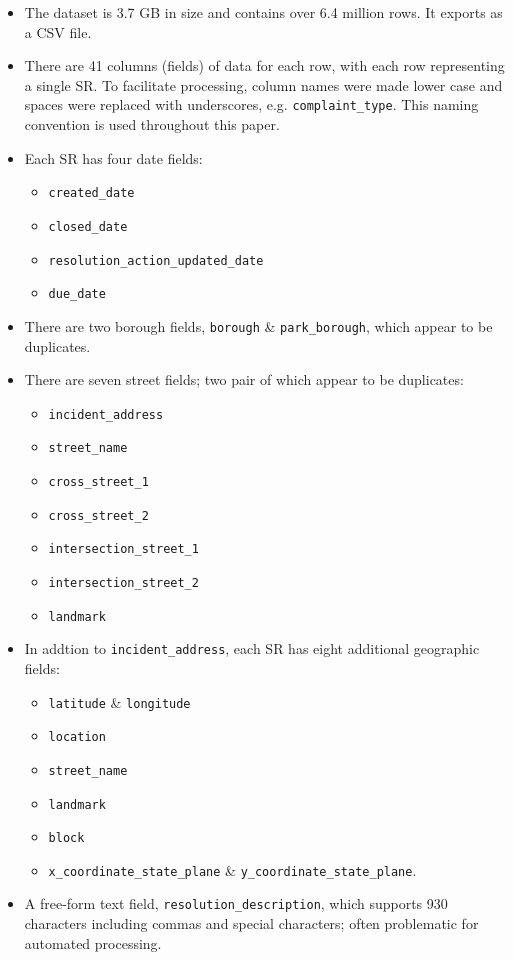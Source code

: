 \documentclass[linenumber]{jdsart}
\begin{document}
\begin{itemize}[left=1.5em]
\item The dataset is 3.7 GB in size and contains 
  over 6.4 million rows. It exports as a CSV file.

\item There are 41 columns (fields) of data for each row, with each
  row representing a single SR. To facilitate 
  processing, column names were made lower case and 
  spaces were replaced with underscores, e.g. \texttt{complaint\_type}. 
  This naming convention is used throughout this paper. 
	
\item Each SR has four date fields: 
	\begin{itemize}	
		\item{\texttt{created\_date}}
		\item{\texttt{closed\_date}}
		\item{\texttt{resolution\_action\_updated\_date}}
		\item{\texttt{due\_date}}
	\end{itemize}

\item There are two borough fields, \texttt{borough} \& \texttt{park\_borough}, 
		which appear to be duplicates.
  
\item There are seven street fields; two pair of which appear to be duplicates:
	\begin{itemize}
		\item{\texttt{incident\_address}}
		\item{\texttt{street\_name}}
		\item{\texttt{cross\_street\_1}}
		\item{\texttt{cross\_street\_2}}
		\item{\texttt{intersection\_street\_1}}
		\item{\texttt{intersection\_street\_2}}
		\item{\texttt{landmark}}
	\end{itemize}
          
\item In addtion to \texttt{incident\_address}, each SR has eight
	additional geographic fields:
	\begin{itemize}
		\item{\texttt{latitude} \& \texttt{longitude}}
		\item{\texttt{location}}
		\item{\texttt{street\_name}}
		\item{\texttt{landmark}}
		\item{\texttt{block}}
		\item{\texttt{x\_coordinate\_state\_plane} \& \texttt{y\_coordinate\_state\_plane}}.
 	\end{itemize}
	
\item A free-form text field, \texttt{resolution\_description}, which 
  supports 930 characters including commas and 
  special characters; often problematic for automated processing.
\end{itemize}
\end{document}
